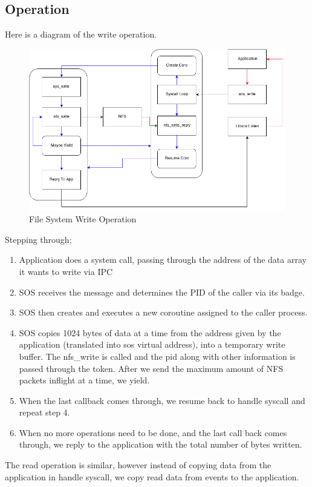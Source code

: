 \documentclass[12pt]{article}
\begin{document}
\subsection{Operation}
Here is a diagram of the write operation.
\begin{figure}[htbp]
\centering
\includegraphics[scale=0.6]{SYS_WRITE}
\caption{File System Write Operation}
\end{figure}
Stepping through;
\begin{enumerate}
\item Application does a system call, passing through the address of the data array it wants to write via IPC
\item SOS receives the message and determines the PID of the caller via its badge.
\item SOS then creates and executes a new coroutine assigned to the caller process.
\item SOS copies 1024 bytes of data at a time from the address given by the application (translated into sos virtual address), into a temporary write buffer. The nfs\_write is called and the pid along with other information is passed through the token. After we send the maximum amount of NFS packets inflight at a time, we yield.
\item When the last callback comes through, we resume back to handle syscall and repeat step 4.
\item When no more operations need to be done, and the last call back comes through, we reply to the application with the total number of bytes written.
\end{enumerate}

The read operation is similar, however instead of copying data from the application in handle syscall, we copy read data from events to the application.
\end{document}

